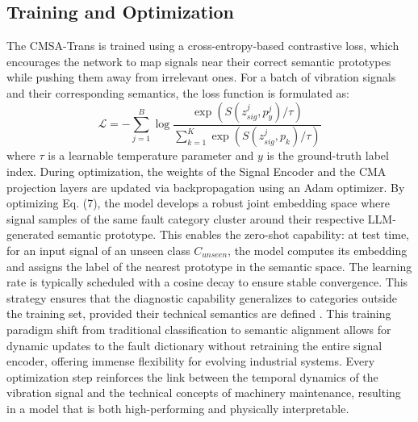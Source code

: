 \subsection{Training and Optimization}
The CMSA-Trans is trained using a cross-entropy-based contrastive loss, which encourages the network to map signals near their correct semantic prototypes while pushing them away from irrelevant ones. For a batch of vibration signals and their corresponding semantics, the loss function is formulated as:
\begin{equation}
\mathcal{L} = - \sum_{j=1}^{B} \log \frac{\exp(S(z_{sig}^j, p_y^j) / \tau)}{\sum_{k=1}^{K} \exp(S(z_{sig}^j, p_k) / \tau)}
\end{equation}
where $\tau$ is a learnable temperature parameter and $y$ is the ground-truth label index. During optimization, the weights of the Signal Encoder and the CMA projection layers are updated via backpropagation using an Adam optimizer. By optimizing Eq. (7), the model develops a robust joint embedding space where signal samples of the same fault category cluster around their respective LLM-generated semantic prototype. This enables the zero-shot capability: at test time, for an input signal of an unseen class $C_{unseen}$, the model computes its embedding and assigns the label of the nearest prototype in the semantic space. The learning rate is typically scheduled with a cosine decay to ensure stable convergence. This strategy ensures that the diagnostic capability generalizes to categories outside the training set, provided their technical semantics are defined \cite{sohn2016improved}. This training paradigm shift from traditional classification to semantic alignment allows for dynamic updates to the fault dictionary without retraining the entire signal encoder, offering immense flexibility for evolving industrial systems. Every optimization step reinforces the link between the temporal dynamics of the vibration signal and the technical concepts of machinery maintenance, resulting in a model that is both high-performing and physically interpretable.